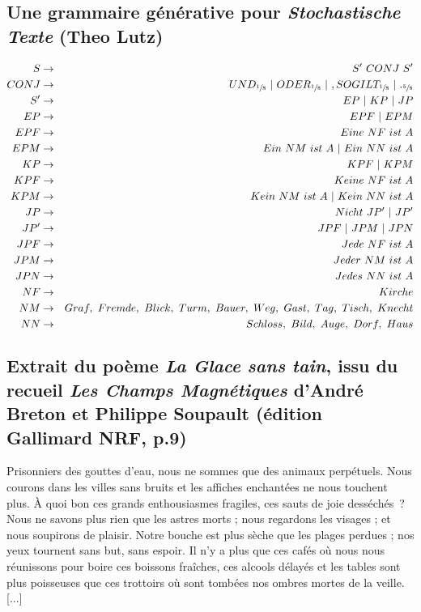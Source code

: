 \documentclass{article}
\begin{document}
		\subsection{Une grammaire générative pour \textit{Stochastische Texte} (Theo Lutz)}\label{lutz_grammar}
			\begin{eqnarray*}
				S &\rightarrow& S' \ CONJ \ S'\\
				CONJ &\rightarrow& UND_{\sfrac{1}{8}} \ | \ ODER_{\sfrac{1}{8}} \ | \ , SO GILT_{\sfrac{1}{8}} \ | \ ._{\sfrac{5}{8}} \\
				S' &\rightarrow& EP\ | \ KP \ |\ JP\\
				EP & \rightarrow& EPF \ | \ EPM\\
				EPF & \rightarrow& Eine \ NF \ ist \ A\\
				EPM & \rightarrow& Ein \ NM \ ist \ A \ | \ Ein \ NN \ ist \ A\\
				KP & \rightarrow& KPF \ | \ KPM\\
				KPF & \rightarrow& Keine \ NF \ ist \ A\\
				KPM & \rightarrow& Kein \ NM \ ist \ A \ | \ Kein \ NN \ ist \ A\\
				JP & \rightarrow& Nicht \ JP' \ | \ JP'\\
				JP' & \rightarrow& JPF \ | \ JPM \ | \ JPN\\
				JPF & \rightarrow& Jede \ NF \ ist \ A\\
				JPM & \rightarrow& Jeder \ NM \ ist \ A\\
				JPN & \rightarrow& Jedes \ NN \ ist \ A\\
				NF & \rightarrow& Kirche\\
				NM & \rightarrow& Graf, \ Fremde, \ Blick, \ Turm, \ Bauer, \ Weg, \ Gast, \ Tag, \ Tisch, \ Knecht\\
				NN &\rightarrow& Schloss, \ Bild, \ Auge, \ Dorf, \ Haus\\
			\end{eqnarray*}
			\newpage
		\subsection{Extrait du poème \textit{La Glace sans tain}\autocite{breton1968g}, issu du recueil \textit{Les Champs Magnétiques} d'André Breton et Philippe Soupault (édition Gallimard NRF, p.9)}
			Prisonniers des gouttes d’eau, nous ne sommes que des animaux perpétuels. Nous courons dans les villes sans bruits et les affiches
			enchantées ne nous touchent plus. À quoi bon ces grands enthousiasmes
			fragiles, ces sauts de joie desséchés~? Nous ne savons plus rien que les
			astres morts ; nous regardons les visages ; et nous soupirons de plaisir.
			Notre bouche est plus sèche que les plages perdues ; nos yeux tournent
			sans but, sans espoir. Il n’y a plus que ces cafés où nous nous réunissons
			pour boire ces boissons fraîches, ces alcools délayés et les tables sont plus
			poisseuses que ces trottoirs où sont tombées nos ombres mortes de la
			veille. [...]
			\newpage
\end{document}
